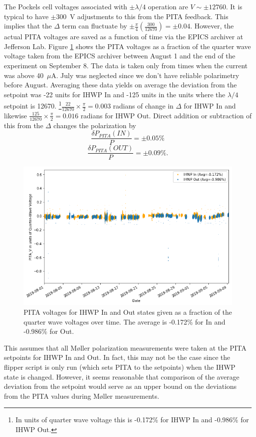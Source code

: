 \documentclass[12pt]{article}
\begin{document}
The Pockels cell voltages associated with $\pm\lambda/4$ operation are $V\sim\pm12760$. It is typical to have $\pm300$~V adjustments to this from the PITA feedback. This implies that the $\Delta$ term can fluctuate by $\pm\frac{\pi}{4}\left(\frac{300}{12670}\right)=\pm0.04$. However, the actual PITA voltages are saved as a function of time via the EPICS archiver at Jefferson Lab.  Figure \ref{fig:pitavst} shows the PITA voltages as a fraction of the quarter wave voltage taken from the EPICS archiver between August 1 and the end of the experiment on September 8. The data is taken only from times when the current was above 40~$\mu$A. July was neglected since we don't have reliable polarimetry before August. Averaging these data yields on average the deviation from the setpoint was -22 units for IHWP In and -125 units in the units where the $\lambda/4$ setpoint is 12670. \footnote{In units of quarter wave voltage this is -0.172\% for IHWP In and -0.986\% for IHWP Out.}$\frac{22}{12670}\times\frac{\pi}{2}=0.003$ radians of change in $\Delta$ for IHWP In and likewise $\frac{125}{12670}\times\frac{\pi}{2}=0.016$ radians for IHWP Out. Direct addition or subtraction of this from the $\Delta$ changes the polarization by
\[
\frac{\delta P_{PITA}(IN)}{P}=\pm0.05\%
\]
\[
\frac{\delta P_{PITA}(OUT)}{P}=\pm0.09\%.
\]
\begin{figure}
\centering
\includegraphics[width=1\textwidth]{pitavst.png}
\caption{\label{fig:pitavst}PITA voltages for IHWP In and Out states given as a fraction of the quarter wave voltages over time. The average is -0.172\% for In and -0.986\% for Out.}
\end{figure}
This assumes that all M\o ller polarization measurements were taken at the PITA setpoints for IHWP In and Out. In fact, this may not be the case since the flipper script is only run (which sets PITA to the setpoints) when the IHWP state is changed. However, it seems reasonable that comparison of the average deviation from the setpoint would serve as an upper bound on the deviations from the PITA values during M\o ller measurements.
\end{document}
